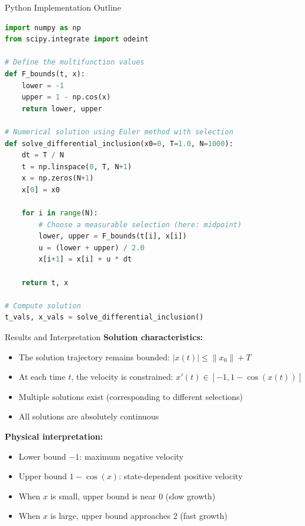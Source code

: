 \documentclass[aspectratio=169,10pt]{beamer}
\begin{document}
\begin{frame}[fragile]{Python Implementation Outline}
\begin{lstlisting}[language=Python]
import numpy as np
from scipy.integrate import odeint

# Define the multifunction values
def F_bounds(t, x):
    lower = -1
    upper = 1 - np.cos(x)
    return lower, upper

# Numerical solution using Euler method with selection
def solve_differential_inclusion(x0=0, T=1.0, N=1000):
    dt = T / N
    t = np.linspace(0, T, N+1)
    x = np.zeros(N+1)
    x[0] = x0

    for i in range(N):
        # Choose a measurable selection (here: midpoint)
        lower, upper = F_bounds(t[i], x[i])
        u = (lower + upper) / 2.0
        x[i+1] = x[i] + u * dt

    return t, x

# Compute solution
t_vals, x_vals = solve_differential_inclusion()
\end{lstlisting}
\end{frame}

\begin{frame}{Results and Interpretation}
\textbf{Solution characteristics:}
\begin{itemize}
    \item The solution trajectory remains bounded: $|x(t)| \le \|x_0\| + T$
    \item At each time $t$, the velocity is constrained: $x'(t) \in [-1, 1-\cos(x(t))]$
    \item Multiple solutions exist (corresponding to different selections)
    \item All solutions are absolutely continuous
\end{itemize}

\vspace{0.3cm}

\textbf{Physical interpretation:}
\begin{itemize}
    \item Lower bound $-1$: maximum negative velocity
    \item Upper bound $1 - \cos(x)$: state-dependent positive velocity
    \item When $x$ is small, upper bound is near 0 (slow growth)
    \item When $x$ is large, upper bound approaches 2 (fast growth)
\end{itemize}
\end{frame}
\end{document}
